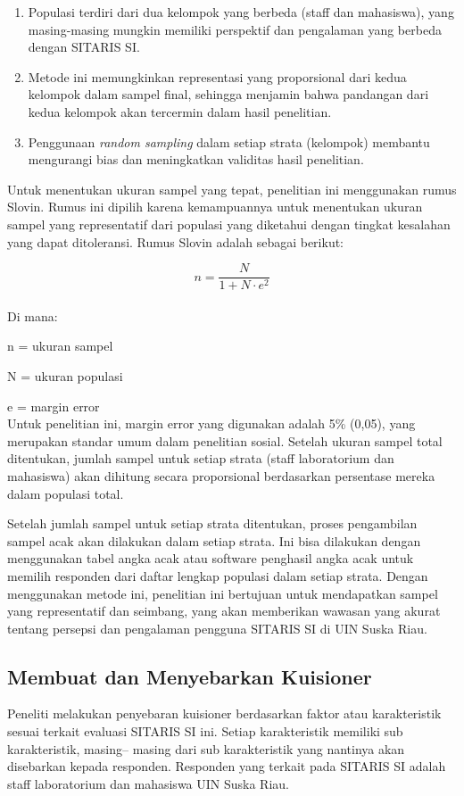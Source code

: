 \begin{enumerate}
	\item Populasi terdiri dari dua kelompok yang berbeda (staff dan mahasiswa), yang masing-masing mungkin memiliki perspektif dan pengalaman yang berbeda dengan SITARIS SI.
	\item Metode ini memungkinkan representasi yang proporsional dari kedua kelompok dalam sampel final, sehingga menjamin bahwa pandangan dari kedua kelompok akan tercermin dalam hasil penelitian.
	\item Penggunaan \textit{random sampling} dalam setiap strata (kelompok) membantu mengurangi bias dan meningkatkan validitas hasil penelitian.
\end{enumerate}

Untuk menentukan ukuran sampel yang tepat, penelitian ini menggunakan rumus Slovin. Rumus ini dipilih karena kemampuannya untuk menentukan ukuran sampel yang representatif dari populasi yang diketahui dengan tingkat kesalahan yang dapat ditoleransi. Rumus Slovin adalah sebagai berikut:

\[ n = \frac{N}{1 + N \cdot e^2} \] \\

Di mana:

n = ukuran sampel

N = ukuran populasi

e = margin error \\

Untuk penelitian ini, margin error yang digunakan adalah 5\% (0,05), yang merupakan standar umum dalam penelitian sosial. Setelah ukuran sampel total ditentukan, jumlah sampel untuk setiap strata (staff laboratorium dan mahasiswa) akan dihitung secara proporsional berdasarkan persentase mereka dalam populasi total.

Setelah jumlah sampel untuk setiap strata ditentukan, proses pengambilan sampel acak akan dilakukan dalam setiap strata. Ini bisa dilakukan dengan menggunakan tabel angka acak atau software penghasil angka acak untuk memilih responden dari daftar lengkap populasi dalam setiap strata.
Dengan menggunakan metode ini, penelitian ini bertujuan untuk mendapatkan sampel yang representatif dan seimbang, yang akan memberikan wawasan yang akurat tentang persepsi dan pengalaman pengguna SITARIS SI di UIN Suska Riau.

\subsection{Membuat dan Menyebarkan Kuisioner}
Peneliti melakukan penyebaran kuisioner berdasarkan faktor atau karakteristik sesuai terkait evaluasi SITARIS SI ini. Setiap karakteristik memiliki sub karakteristik, masing– masing dari sub karakteristik yang nantinya akan disebarkan kepada responden. Responden yang terkait pada SITARIS SI adalah staff laboratorium dan mahasiswa UIN Suska Riau.

